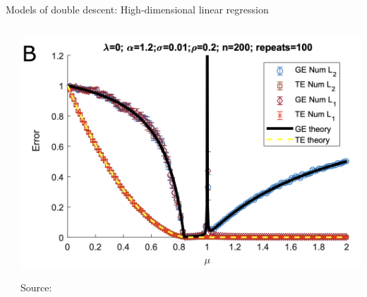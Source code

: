 \documentclass[10pt, aspectratio=169]{beamer}
\begin{document}
\begin{frame}[t]{Models of double descent: High-dimensional linear regression}
\begin{columns}
\begin{column}{0.6\linewidth}
\end{column}
\begin{column}{0.4\linewidth}
\begin{center}
\hspace{-1cm}
\includegraphics[width=0.8\linewidth]{part-4-images/mispar.png}

\vspace{-0.2cm}
{\scriptsize Source: \citep{mitra2019understanding}}
\end{center}

\end{column}
\end{columns}
\end{frame}
\end{document}
